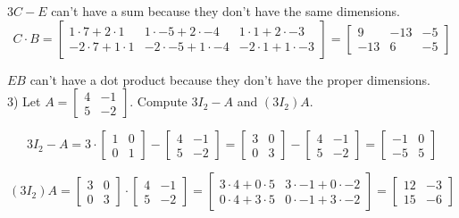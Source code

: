 \documentclass[a4paper]{article}
\begin{document}
$3C-E$ can't have a sum because they don't have the same dimensions.\\

\[C \cdot B=
\begin{bmatrix}
1\cdot7+2\cdot1&1\cdot-5+2\cdot-4&1\cdot1+2\cdot-3\\
-2\cdot7+1\cdot1&-2\cdot-5+1\cdot-4&-2\cdot1+1\cdot-3
\end{bmatrix}=
\begin{bmatrix}
9&-13&-5\\
-13&6&-5
\end{bmatrix}
\]

$EB$ can't have a dot product because they don't have the proper dimensions.\\

3) Let $A = \begin{bmatrix}
4&-1\\
5&-2
\end{bmatrix}$. Compute $3I_2 - A$ and $(3I_2)A$.

\[3I_2-A=3\cdot
\begin{bmatrix}
1&0\\
0&1
\end{bmatrix}-
\begin{bmatrix}
4&-1\\
5&-2
\end{bmatrix}=
\begin{bmatrix}
3&0\\
0&3
\end{bmatrix}-
\begin{bmatrix}
4&-1\\
5&-2
\end{bmatrix}=
\begin{bmatrix}
-1&0\\
-5&5
\end{bmatrix}
\]

\[(3I_2)A =
\begin{bmatrix}
3&0\\
0&3
\end{bmatrix}\cdot
\begin{bmatrix}
4&-1\\
5&-2
\end{bmatrix}=
\begin{bmatrix}
3\cdot4+0\cdot5&3\cdot-1+0\cdot-2\\
0\cdot4+3\cdot5&0\cdot-1+3\cdot-2
\end{bmatrix}=
\begin{bmatrix}
12&-3\\
15&-6
\end{bmatrix}
\]\\
\end{document}
